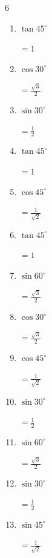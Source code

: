 \begin{multicols}{6}
\begin{enumerate}
  \item $\displaystyle \tan{45^\circ}$

        $\displaystyle =1$

  \item $\displaystyle \cos{30^\circ}$

        $\displaystyle =\frac{\sqrt{3}}{2}$

  \item $\displaystyle \sin{30^\circ}$

        $\displaystyle =\frac{1}{2}$

  \item $\displaystyle \tan{45^\circ}$

        $\displaystyle =1$

  \item $\displaystyle \cos{45^\circ}$

        $\displaystyle =\frac{1}{\sqrt{2}}$

  \item $\displaystyle \tan{45^\circ}$

        $\displaystyle =1$

  \item $\displaystyle \sin{60^\circ}$

        $\displaystyle =\frac{\sqrt{3}}{2}$

  \item $\displaystyle \cos{30^\circ}$

        $\displaystyle =\frac{\sqrt{3}}{2}$

  \item $\displaystyle \cos{45^\circ}$

        $\displaystyle =\frac{1}{\sqrt{2}}$

  \item $\displaystyle \sin{30^\circ}$

        $\displaystyle =\frac{1}{2}$

  \item $\displaystyle \sin{60^\circ}$

        $\displaystyle =\frac{\sqrt{3}}{2}$

\columnbreak %

  \item $\displaystyle \sin{30^\circ}$

        $\displaystyle =\frac{1}{2}$

  \item $\displaystyle \sin{45^\circ}$

        $\displaystyle =\frac{1}{\sqrt{2}}$


\end{enumerate}
\end{multicols}
